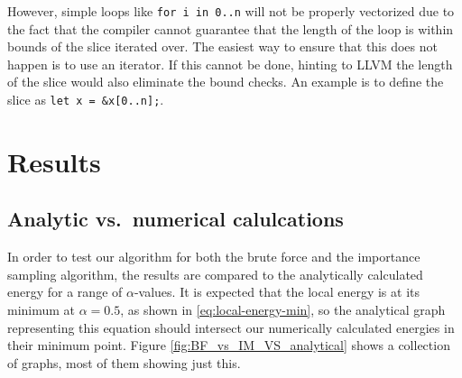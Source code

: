 \documentclass[
]{article}
\begin{document}
However, simple loops like \texttt{for\ i\ in\ 0..n} will not be
properly vectorized due to the fact that the compiler cannot guarantee
that the length of the loop is within bounds of the slice iterated over.
The easiest way to ensure that this does not happen is to use an
iterator. If this cannot be done, hinting to LLVM the length of the
slice would also eliminate the bound checks. An example is to define the
slice as \texttt{let\ x\ =\ \&x{[}0..n{]};}.

\hypertarget{results}{%
\section{Results}\label{results}}

\hypertarget{analytic-vs.-numerical-calulcations}{%
\subsection{Analytic vs.~numerical
calulcations}\label{analytic-vs.-numerical-calulcations}}

In order to test our algorithm for both the brute force and the
importance sampling algorithm, the results are compared to the
analytically calculated energy for a range of \(\alpha\)-values. It is
expected that the local energy is at its minimum at \(\alpha = 0.5\), as
shown in \eqref{eq:local-energy-min}, so the analytical graph
representing this equation should intersect our numerically calculated
energies in their minimum point. Figure \ref{fig:BF_vs_IM_VS_analytical}
shows a collection of graphs, most of them showing just this.
\end{document}
